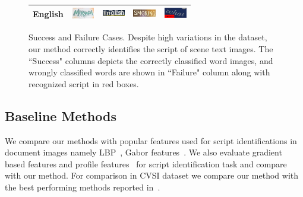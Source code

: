 \begin{figure}[t!]
\begin{tabular}{|l||ccc||c|}
English & \includegraphics[height=0.5cm,width=1.0cm]{figures/Results/Success/English_1.jpg} & \includegraphics[height=0.5cm,width=1.0cm]{figures/Results/Success/English_2.jpg} & \includegraphics[height=0.5cm,width=1.0cm]{figures/Results/Success/English_3.jpg} & \includegraphics[height=0.5cm,width=1.0cm]{figures/Results/Failure/eng_kan.png} \\
\hline

\end{tabular}
\caption{Success and Failure Cases. Despite high variations in the dataset, our method correctly identifies the script of scene text images. The ``Success" columns depicts the correctly classified word images, and wrongly classified words are shown in ``Failure" column along with recognized script in red boxes.}
  \label{fig:visRes1}
\end{figure}

\subsection{Baseline Methods}
We compare our methods with popular features used for script identifications in document images
namely LBP~\cite{LBPOjala2002}, Gabor features~\cite{Pati}. We also evaluate gradient based features and profile features~\cite{Manmatha12} for script identification task and compare with our method. For comparison in CVSI dataset we compare our method with the best performing methods reported in~\cite{CVSIComp}.


%

